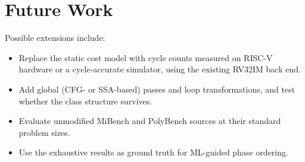 \documentclass[conference]{IEEEtran}
\begin{document}
\section{Future Work}
Possible extensions include:
\begin{itemize}
    \item Replace the static cost model with cycle counts measured on RISC-V hardware or a cycle-accurate simulator, using the existing RV32IM back end.
    \item Add global (CFG- or SSA-based) passes and loop transformations, and test whether the class structure survives.
    \item Evaluate unmodified MiBench and PolyBench sources at their standard problem sizes.
    \item Use the exhaustive results as ground truth for ML-guided phase ordering.
\end{itemize}
\end{document}
